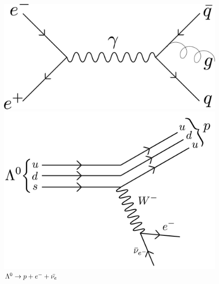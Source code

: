 \begin{figure}[hbtp]
\begin{minipage}{0.4\textwidth}
        \caption{$ \Delta^+ \to p \pi^0$}
    \end{minipage}
    \hspace{0.1\textwidth}
    \begin{minipage}{0.4\textwidth}
        \includegraphics[scale=0.3]{Feynman/decaycircular.jpg}
        \caption{$e^+ e^- \to q \Bar{q} g$}
    \end{minipage}
    \vspace{30pt}
    \begin{minipage}{0.4\textwidth}
        \includegraphics[scale=0.05]{Feynman/lambda0-01.jpg}
        \caption{$\Lambda^0 \to p + e^- + \Bar{\nu_e}$}
    \end{minipage}
    \hspace{0.1\textwidth}
    \begin{minipage}{0.4\textwidth}

\end{minipage}
\end{figure}
